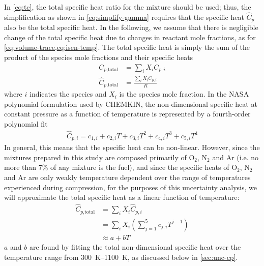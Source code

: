 \documentclass[../main.tex]{subfiles}
\begin{document}
In \cref{eq:tc}, the total specific heat ratio for the mixture
should be used; thus, the simplification as shown in \cref{eq:simplify-gamma}
requires that the specific heat $\hat{C}_p$ also be the total specific
heat. In the following, we assume that there is negligible
change of the total specific heat due to changes in reactant
mole fractions, as for \cref{eq:volume-trace,eq:isen-temp}.
The total specific heat is simply the sum of the product of
the species mole fractions and their specific heats
%
\begin{subequations}
\label{eq:cp}
\begin{align}
C_{p\text{,total}} &= \sum_i X_i C_{p,i} \\
\hat{C}_{p\text{,total}} &= \frac{\sum_i X_i C_{p,i}}{R}
\end{align}
\end{subequations}
%
where $i$ indicates the species and $X_i$ is the species mole fraction.
In the NASA polynomial formulation used by CHEMKIN, the non-dimensional specific
heat at constant pressure as a function of temperature is represented by a
fourth-order polynomial fit
%
\begin{align}
\label{eq:cp-nasa}
\hat{C}_{p,i} = c_{1,i} + c_{2,i} T + c_{3,i} T^2 + c_{4,i} T^3 + c_{5,i} T^4
\end{align}
%
In general, this means that the specific heat can be non-linear. However,
since the mixtures prepared in this study are composed primarily of
O$_2$, N$_2$ and Ar (i.e. no more than 7\% of any mixture is the
fuel), and since the specific heats of O$_2$, N$_2$ and Ar are only weakly
temperature dependent over the range of temperatures experienced during
compression, for the purposes of this uncertainty analysis, we will
approximate the total specific heat as a linear function of temperature:
%
\begin{equation}
\label{eq:cp-total}
\begin{split}
\hat{C}_{p\text{,total}} &= \sum_i X_i \hat{C}_{p,i} \\
&= \sum_i X_i \left( \sum_{j=1}^5 c_{j,i} T^{j-1} \right) \\
&\approx a + b T
\end{split}
\end{equation}
%
$a$ and $b$ are found by fitting the total non-dimensional specific heat
over the temperature range from \SIrange{300}{1100}{\kelvin}, as
discussed below in \cref{sec:unc-cp}.
\end{document}
